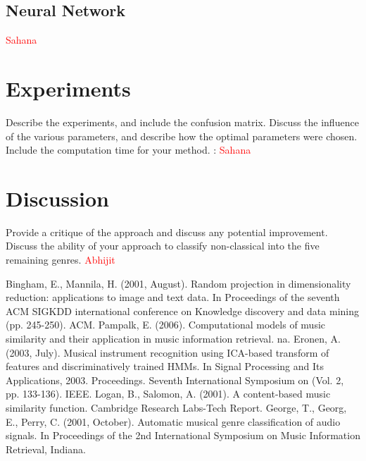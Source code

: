 \documentclass[12pt]{article}
\begin{document}
\subsection{Neural Network}\textcolor{red}{Sahana}
\section{Experiments}
Describe the experiments, and include the confusion matrix. Discuss
the influence of the various parameters, and describe how the optimal
parameters were chosen. Include the computation time for your method. : \textcolor{red}{Sahana}
\section{Discussion}
Provide a critique of the approach and discuss any potential
improvement. Discuss the ability of your approach to classify
non-classical into the five remaining genres. \textcolor{red}{Abhijit}
\begin{thebibliography}{9}
	Bingham, E., Mannila, H. (2001, August). Random projection in dimensionality reduction: applications to image and text data. In Proceedings of the seventh ACM SIGKDD international conference on Knowledge discovery and data mining (pp. 245-250). ACM.
	 Pampalk, E. (2006). Computational models of music similarity and their application in music information retrieval. na.
	 Eronen, A. (2003, July). Musical instrument recognition using ICA-based transform of features and discriminatively trained HMMs. In Signal Processing and Its Applications, 2003. Proceedings. Seventh International Symposium on (Vol. 2, pp. 133-136). IEEE.
	 Logan, B., Salomon, A. (2001). A content-based music similarity function. Cambridge Research Labs-Tech Report.
	 George, T., Georg, E., Perry, C. (2001, October). Automatic musical genre classification of audio signals. In Proceedings of the 2nd International Symposium on Music Information Retrieval, Indiana.
\end{thebibliography}
\end{document}
